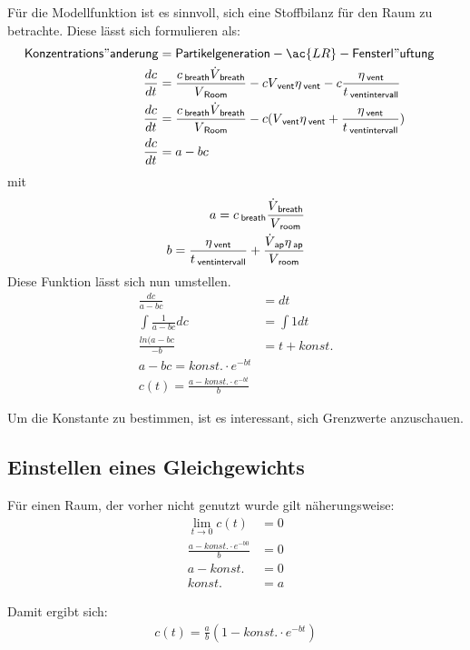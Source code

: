 \documentclass[12pt,a4paper,bibtotocnumbered,liststotocnumbered]{scrreprt}
\begin{document}
Für die Modellfunktion ist es sinnvoll, sich eine Stoffbilanz für den Raum zu betrachte. Diese lässt sich formulieren als:
\begin{align}
\mathsf{Konzentrations"anderung} &=   \mathsf{Partikelgeneration} -  \ac{LR} - \mathsf{Fensterl"uftung}\\
\frac{dc}{dt} &= \frac{c\tief{breath}\dot{V}\tief{breath}}{V\tief{Room}} - c V\tief{vent} \eta\tief{vent} - c \frac{\eta\tief{vent}}{t\tief{ventintervall}}\\
\frac{dc}{dt} &= \frac{c\tief{breath}\dot{V}\tief{breath}}{V\tief{Room}}  - c (V\tief{vent} \eta\tief{vent} +\frac{\eta\tief{vent}}{t\tief{ventintervall}})&\\
\frac{dc}{dt} &= a - b c
\end{align}
mit
\begin{align}
a = c_{\: \mathsf{breath}} \frac{\dot{V}_{\: \mathsf{breath}}}{V_{\: \mathsf{room}}}\\
\label{Equ.: konst b}
b = \frac{ \eta_{\: \mathsf{vent}} }{t_{\: \mathsf{ventintervall}}} +\frac{\dot{V}_{\: \mathsf{ap}}  \eta_{\: \mathsf{ap}}}{V_{\: \mathsf{room}}}
\end{align}
Diese Funktion lässt sich nun umstellen.
\begin{align}
\frac{dc}{a - b c} &= dt\\
\int \frac{1}{a - b c} dc &=\int 1 dt\\
\frac{ln(a - b c}{-b} &=t + konst.\\
a- b c = konst. \cdot e^{-bt}\\
c(t) = \frac{a - konst. \cdot e^{-bt}}{b}
\end{align}



Um die Konstante zu bestimmen, ist es interessant, sich Grenzwerte anzuschauen.\\

\subsection{Einstellen eines Gleichgewichts}
Für einen Raum, der vorher nicht genutzt wurde gilt näherungsweise:
\begin{align}
\lim \limits_{t \to 0} c(t) & = 0\\
 \frac{a - konst. \cdot e^{-b0}}{b} &= 0\\
a - konst. &= 0\\
konst. &= a
\end{align}

Damit ergibt sich:
\begin{align}
c(t) = \frac{a}{b}(1 - konst. \cdot e^{-bt})
\end{align}
\end{document}
